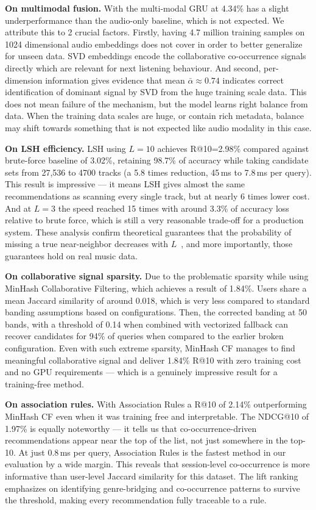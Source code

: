 \documentclass[conference]{IEEEtran}
\begin{document}
\textbf{On multimodal fusion.}
With the multi-modal GRU at 4.34\% has a slight underperformance than the
audio-only baseline, which is not expected. We attribute this to 2 crucial
factors. Firstly, having 4.7 million training samples on 1024 dimensional
audio embeddings does not cover in order to better generalize for unseen data.
SVD embeddings encode the collaborative co-occurrence signals directly which
are relevant for next listening behaviour. And second, per-dimension
information gives evidence that mean $\bar{\alpha} \approx 0.74$ indicates
correct identification of dominant signal by SVD from the huge training scale
data. This does not mean failure of the mechanism, but the model learns right
balance from data. When the training data scales are huge, or contain rich
metadata, balance may shift towards something that is not expected like audio
modality in this case.

\textbf{On LSH efficiency.}
LSH using $L=10$ achieves R@10=2.98\% compared against brute-force baseline
of 3.02\%, retaining 98.7\% of accuracy while taking candidate sets from
27,536 to 4700 tracks (a 5.8 times reduction, 45\,ms to 7.8\,ms per query).
This result is impressive --- it means LSH gives almost the same
recommendations as scanning every single track, but at nearly 6 times lower
cost. And at $L=3$ the speed reached 15 times with around 3.3\% of accuracy
loss relative to brute force, which is still a very reasonable trade-off for
a production system. These analysis confirm theoretical guarantees that the
probability of missing a true near-neighbor decreases with $L$~\cite{datar2004},
and more importantly, those guarantees hold on real music data.

\textbf{On collaborative signal sparsity.}
Due to the problematic sparsity while using MinHash Collaborative Filtering,
which achieves a result of 1.84\%. Users share a mean Jaccard similarity of
around 0.018, which is very less compared to standard banding assumptions
based on configurations. Then, the corrected banding at 50 bands, with a
threshold of 0.14 when combined with vectorized fallback can recover candidates
for 94\% of queries when compared to the earlier broken configuration. Even
with such extreme sparsity, MinHash CF manages to find meaningful collaborative
signal and deliver 1.84\% R@10 with zero training cost and no GPU requirements
--- which is a genuinely impressive result for a training-free method.

\textbf{On association rules.}
With Association Rules a R@10 of 2.14\% outperforming MinHash CF even when it
was training free and interpretable. The NDCG@10 of 1.97\% is equally
noteworthy --- it tells us that co-occurrence-driven recommendations appear
near the top of the list, not just somewhere in the top-10. At just 0.8\,ms
per query, Association Rules is the fastest method in our evaluation by a
wide margin. This reveals that session-level co-occurrence is more informative
than user-level Jaccard similarity for this dataset. The lift ranking
emphasizes on identifying genre-bridging and co-occurrence patterns to survive
the threshold, making every recommendation fully traceable to a rule.
\end{document}
